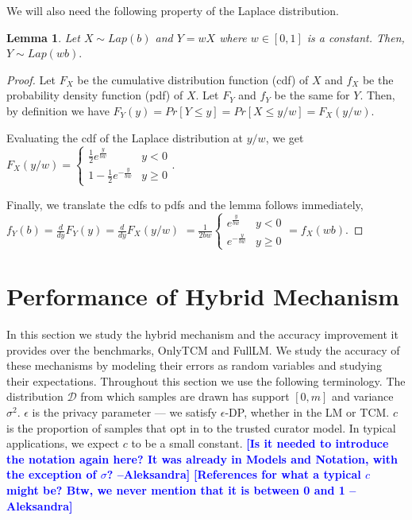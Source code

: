 \documentclass{article}
\newcommand{\ak}[1]{\textcolor{blue}{\bf\small [#1 --Aleksandra]}}
\theoremstyle{plain}
\newtheorem{lem}[thm]{Lemma}
\begin{document}
We will also need the following property of the Laplace distribution. 
\begin{lem} \label{wtimeslap}
Let $X \sim Lap(b)$ and $Y = wX$ where $w \in [0,1]$ is a constant. Then, 
$Y \sim Lap(wb).$
\end{lem}
\begin{proof}
Let $F_X$ be the cumulative distribution function (cdf) of $X$ and $f_X$ be the probability density function (pdf) of $X$. Let $F_Y$ and $f_Y$ be the same for $Y$. Then, by definition we have 
$F_Y(y) = Pr[Y \leq y] = Pr[X \leq y/w] = F_X(y/w).$
	
Evaluating the cdf of the Laplace distribution at $y/w$, we get 
$F_X(y/w) = 
	\begin{cases} 
      \frac{1}{2}e^{\frac{y}{bw}} & y < 0 \\
      1 - \frac{1}{2}e^{-\frac{y}{bw}} & y \geq 0 
	\end{cases} .$
	
Finally, we translate the cdfs to pdfs and the lemma follows immediately, \\
$f_Y(b) = \frac{d}{dy}F_Y(y) = \frac{d}{dy}F_X(y/w) $
$= \frac{1}{2bw}
	\begin{cases} 
      e^{\frac{y}{bw}} & y < 0 \\
      e^{-\frac{y}{bw}} & y \geq 0 
	\end{cases}
     = f_X(wb).$
\end{proof}



\section{Performance of Hybrid Mechanism}\label{sec:performance}
In this section we study the hybrid mechanism and the accuracy improvement it provides over the benchmarks, OnlyTCM and FullLM. We study the accuracy of these mechanisms by modeling their errors as random variables and studying their expectations. Throughout this section we use the following terminology. The distribution $\mathcal{D}$ from which samples are drawn has support $[0,m]$ and variance $\sigma^2$. $\epsilon$ is the privacy parameter — we satisfy $\epsilon$-DP, whether in the LM or TCM. $c$ is the proportion of samples that opt in to the trusted curator model. In typical applications, we expect $c$ to be a small constant.  \ak{Is it needed to introduce the notation again here? It was already in Models and Notation, with the exception of $\sigma$?} \ak{References for what a typical $c$ might be? Btw, we never mention that it is between 0 and 1} 
\end{document}
